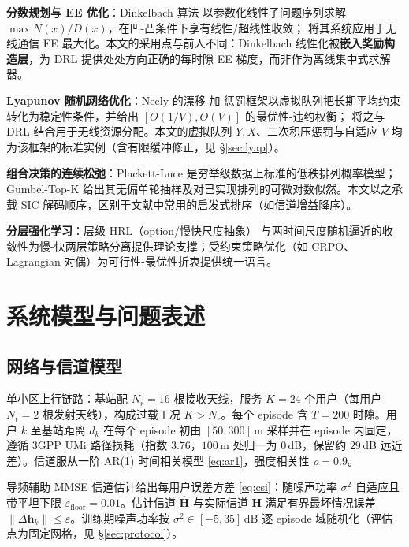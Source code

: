 \documentclass[UTF8,11pt,a4paper]{ctexart}
\theoremstyle{plain}
\theoremstyle{definition}
\theoremstyle{remark}
\newcommand{\vect}[1]{\mathbf{#1}}
\begin{document}
\textbf{分数规划与 EE 优化}：Dinkelbach 算法\cite{dinkelbach1967nonlinear} 以参数化线性子问题序列求解 $\max N(x)/D(x)$，在凹-凸条件下享有线性/超线性收敛；\cite{shen2021fractional} 将其系统应用于无线通信 EE 最大化。本文的采用点与前人不同：Dinkelbach 线性化被\textbf{嵌入奖励构造层}，为 DRL 提供处处方向正确的每时隙 EE 梯度，而非作为离线集中式求解器。

\textbf{Lyapunov 随机网络优化}：Neely\cite{neely2010stochastic} 的漂移-加-惩罚框架以虚拟队列把长期平均约束转化为稳定性条件，并给出 $[O(1/V), O(V)]$ 的最优性-违约权衡；\cite{li2021lyapunov, chen2019lyapunov} 将之与 DRL 结合用于无线资源分配。本文的虚拟队列 $Y,X$、二次积压惩罚与自适应 $V$ 均为该框架的标准实例（含有限缓冲修正，见 \S\ref{sec:lyap}）。

\textbf{组合决策的连续松弛}：Plackett-Luce\cite{plackett1975analysis, luce1959} 是穷举级数据上标准的低秩排列概率模型；Gumbel-Top-K\cite{kool2019stochastic} 给出其无偏单轮抽样及对已实现排列的可微对数似然。本文以之承载 SIC 解码顺序，区别于文献中常用的启发式排序（如信道增益降序）。

\textbf{分层强化学习}：层级 HRL（option/慢快尺度抽象）\cite{sutton1999policy} 与两时间尺度随机逼近的收敛性为慢-快两层策略分离提供理论支撑；受约束策略优化（如 CRPO\cite{xu2021crpo}、Lagrangian 对偶）为可行性-最优性折衷提供统一语言。

\section{系统模型与问题表述} \label{sec:model}

\subsection{网络与信道模型}

单小区上行链路：基站配 $N_r=16$ 根接收天线，服务 $K=24$ 个用户（每用户 $N_t=2$ 根发射天线），构成过载工况 $K>N_r$。每个 episode 含 $T=200$ 时隙。用户 $k$ 至基站距离 $d_k$ 在每个 episode 初由 $[50,300]\,\mathrm{m}$ 采样并在 episode 内固定，遵循 3GPP UMi 路径损耗（指数 $3.76$，$100$\,m 处归一为 $0$\,dB，保留约 $29$\,dB 远近差）。信道服从一阶 AR(1) 时间相关模型 \eqref{eq:ar1}，强度相关性 $\rho=0.9$。

导频辅助 MMSE 信道估计给出每用户误差方差 \eqref{eq:csi}：随噪声功率 $\sigma^2$ 自适应且带平坦下限 $\varepsilon_{\mathrm{floor}}=0.01$。估计信道 $\hat{\vect{H}}$ 与实际信道 $\vect H$ 满足有界最坏情况误差 $\|\Delta\vect h_k\|\le\varepsilon$。训练期噪声功率按 $\sigma^2\in[-5,35]\,\mathrm{dB}$ 逐 episode 域随机化（评估点为固定网格，见 \S\ref{sec:protocol}）。
\end{document}
